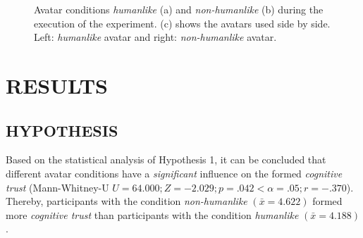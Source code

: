 \documentclass[sigchi]{acmart}
\begin{document}
\begin{figure}[h]
  \centering
  \qquad
  \qquad
  \caption[The avatars in the experimental environment]{Avatar conditions \textit{humanlike} (a) and \textit{non-humanlike} (b) during the execution of the experiment. (c) shows the avatars used side by side. Left: \textit{humanlike} avatar and right: \textit{non-humanlike} avatar.}
  \label{AvatareImEinsatz}
\end{figure}

\section{RESULTS}
\subsection{HYPOTHESIS}
Based on the statistical analysis of Hypothesis 1, it can be concluded that different avatar conditions have a \textit{significant} influence on the formed \textit{cognitive trust} (Mann-Whitney-U $U = 64.000; Z = -2.029; p =.042 < \alpha =.05; r =-.370$). Thereby, participants with the condition \textit{non-humanlike} $(\bar{x} = 4.622)$ formed more \textit{cognitive trust} than participants with the condition \textit{humanlike} $(\bar{x} = 4.188)$. 
\end{document}
